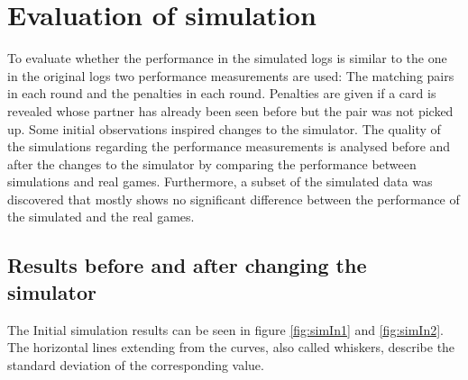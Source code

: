 \section{Evaluation of simulation}
\label{evaluation_of_simulation}
To evaluate whether the performance in the simulated logs is similar to the one in the original logs two performance measurements are used: The matching pairs in each round and the penalties in each round. Penalties are given if a card is revealed whose partner has already been seen before but the pair was not picked up. Some initial observations inspired changes to the simulator. The quality of the simulations regarding the performance measurements is analysed before and after the changes to the simulator by comparing the performance between simulations and real games. Furthermore, a subset of the simulated data was discovered that mostly shows no significant difference between the performance of the simulated and the real games.

\subsection{Results before and after changing the simulator}
\label{results_before_and_after_changing_the_simulator}
The Initial simulation results can be seen in figure \ref{fig:simIn1} and \ref{fig:simIn2}. The horizontal lines extending from the curves, also called whiskers, describe the standard deviation of the corresponding value. 


